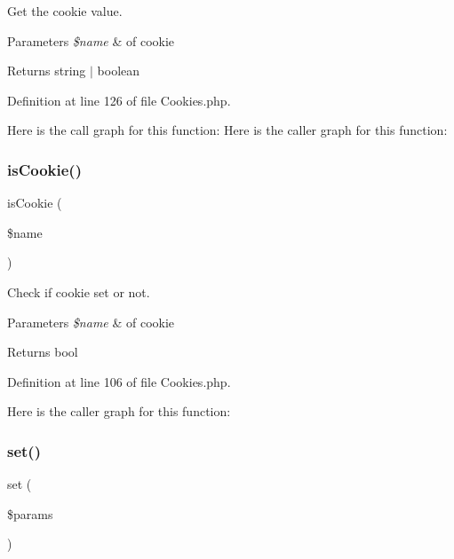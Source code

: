 Get the cookie value.


\begin{DoxyParams}{Parameters}
{\em \$name} & of cookie\\
\hline
\end{DoxyParams}
\begin{DoxyReturn}{Returns}
string $\vert$ boolean 
\end{DoxyReturn}


Definition at line 126 of file Cookies.\+php.

Here is the call graph for this function\+:
Here is the caller graph for this function\+:
\mbox{\label{class_zest_1_1_cookies_1_1_cookies_ac6f668aff0e191a6077c7b2c1694d4cd}} 
\subsubsection{\texorpdfstring{is\+Cookie()}{isCookie()}}
{\footnotesize\ttfamily is\+Cookie (\begin{DoxyParamCaption}\item[{}]{\$name }\end{DoxyParamCaption})}

Check if cookie set or not.


\begin{DoxyParams}{Parameters}
{\em \$name} & of cookie\\
\hline
\end{DoxyParams}
\begin{DoxyReturn}{Returns}
bool 
\end{DoxyReturn}


Definition at line 106 of file Cookies.\+php.

Here is the caller graph for this function\+:
\mbox{\label{class_zest_1_1_cookies_1_1_cookies_a8b2f390bd6d86a3f047038e3535028b8}} 
\subsubsection{\texorpdfstring{set()}{set()}}
{\footnotesize\ttfamily set (\begin{DoxyParamCaption}\item[{}]{\$params }\end{DoxyParamCaption})}

